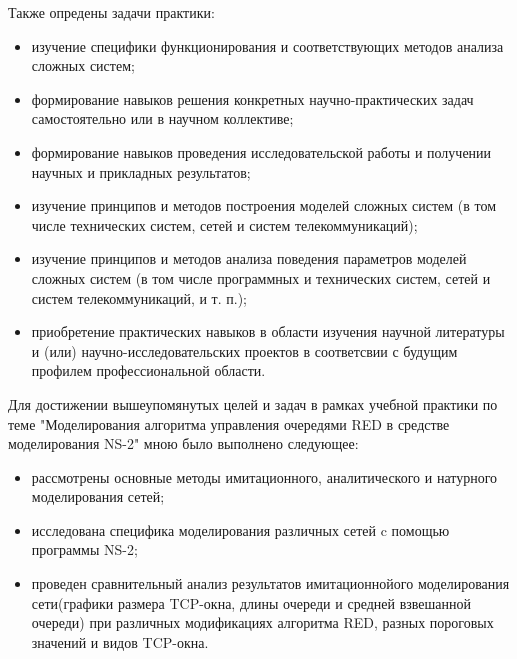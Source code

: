 Также опредены задачи практики:
\begin{itemize}
\item изучение специфики функционирования и соответствующих  методов анализа сложных систем;
\item формирование навыков решения конкретных научно-практических задач самостоятельно или в научном коллективе; 
\item формирование навыков проведения исследовательской работы и получении научных и прикладных результатов;
\item изучение принципов и методов построения моделей сложных систем (в том числе технических систем, сетей и систем телекоммуникаций);
\item изучение принципов и методов анализа поведения параметров моделей сложных систем (в том числе программных и технических систем, сетей и систем телекоммуникаций, и т. п.);
\item приобретение практических навыков в области изучения научной литературы и (или) научно-исследовательских проектов в соответсвии с будущим    профилем профессиональной области.
\end{itemize}


Для достижении вышеупомянутых целей и задач в рамках учебной практики по теме "Моделирования алгоритма управления очередями RED в средстве моделирования NS-2" мною было выполнено следующее:
\begin{itemize}
\item рассмотрены основные методы имитационного, аналитического и натурного моделирования сетей;
\item исследована специфика моделирования различных сетей c помощью программы NS-2;
\item проведен сравнительный анализ результатов имитационнойого моделирования сети(графики размера TCP-окна, длины очереди и средней взвешанной очереди) при различных модификациях алгоритма RED, разных пороговых значений и видов TCP-окна. 
\end{itemize}
